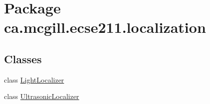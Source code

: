 \hypertarget{namespaceca_1_1mcgill_1_1ecse211_1_1localization}{}\section{Package ca.\+mcgill.\+ecse211.\+localization}
\label{namespaceca_1_1mcgill_1_1ecse211_1_1localization}
\subsection*{Classes}
\begin{DoxyCompactItemize}
\item 
class \hyperlink{classca_1_1mcgill_1_1ecse211_1_1localization_1_1_light_localizer}{Light\+Localizer}
\item 
class \hyperlink{classca_1_1mcgill_1_1ecse211_1_1localization_1_1_ultrasonic_localizer}{Ultrasonic\+Localizer}
\end{DoxyCompactItemize}
